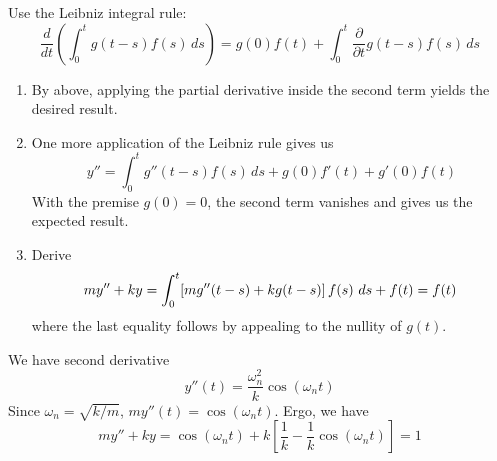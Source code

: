\documentclass[a4paper]{article}
\begin{document}
Use the Leibniz integral rule:
\[
	\frac{d }{d t} \!\left( \int^{t}_{0} g \!\left( t - s \right) f \!\left( s \right)  \, ds \right) = g\!\left( 0 \right) f \!\left( t \right) + \int^{t}_{0} \frac{\partial }{\partial t} g \!\left( t - s \right) f \!\left( s \right)  \, ds 
\]

\begin{enumerate}[label=(\arabic*)]
	\item By above, applying the partial derivative inside the second term yields the desired result.
	\item One more application of the Leibniz rule gives us
	\[
		y'' = \int^{t}_{0} g''\!\left( t - s \right) f \!\left( s \right)  \, ds + g \!\left( 0 \right) f'\!\left( t \right) + g'\!\left( 0 \right) f \!\left( t \right) 
	\]
	With the premise \(g \!\left( 0 \right) = 0\), the second term vanishes and gives us the expected result.
	\item Derive
	\[
		my'' + ky = \int^{t}_{0} \!\left[ mg''\!\left( t - s \right) + kg \!\left( t - s \right)  \right] f \!\left( s \right)  \, ds + f \!\left( t \right) = f \!\left( t \right)   \\
	\]
	where the last equality follows by appealing to the nullity of \(g \!\left( t \right) \).
\end{enumerate}


We have second derivative
\[
	y''\!\left( t \right) = \frac{\omega_{n}^{2}}{k}\cos\left( \omega_{n}t \right)	
\]
Since \(\omega_{n} = \sqrt{k / m}\), \(my''\!\left( t \right) = \cos\left( \omega_{n}t \right)\). Ergo, we have
\[
	my'' + ky = \cos\left( \omega_{n}t \right) + k \!\left[ \frac{1}{k} - \frac{1}{k}\cos\left( \omega_{n}t \right) \right] = 1
\]

\end{document}
